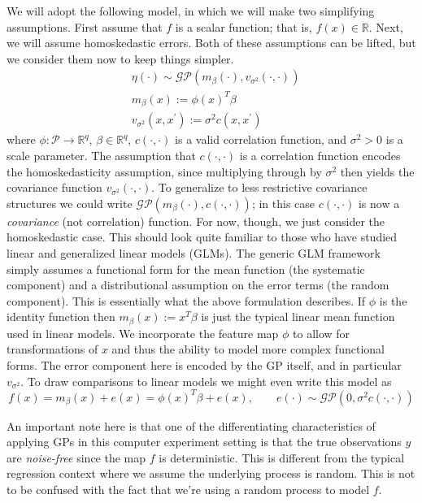 \documentclass[12pt]{article}
\newcommand{\R}{\mathcal{R}}
\def\R{\mathbb{R}}
\begin{document}
We will adopt the following model, in which we will make two simplifying assumptions. First assume that $f$ is a scalar function; that is, $f(x) \in \R$. Next, we will assume homoskedastic 
errors. Both of these assumptions can be lifted, but we consider them now to keep things simpler.
\begin{align*}
&\eta(\cdot) \sim \mathcal{GP}(m_\beta (\cdot), v_{\sigma^2}(\cdot, \cdot)) \\
&m_\beta (x) := \phi(x)^T \beta \\
&v_{\sigma^2}(x, x^\prime) := \sigma^2 c(x, x^\prime)
\end{align*}
where $\phi: \mathcal{P} \to \R^q$, $\beta \in \R^q$, $c(\cdot, \cdot)$ is a valid correlation function, and $\sigma^2 > 0$ is a scale parameter. The assumption that $c(\cdot, \cdot)$ is a correlation function
encodes the homoskedasticity assumption, since multiplying through by $\sigma^2$ then yields the covariance function $v_{\sigma^2}(\cdot, \cdot)$. To generalize to less restrictive covariance structures 
we could write $\mathcal{GP}(m_\beta(\cdot), c(\cdot, \cdot))$; in this case $c(\cdot, \cdot)$ is now a \textit{covariance} (not correlation) function. For now, though, we just consider the homoskedastic case. 
This should look quite familiar to those who have studied linear and generalized linear models (GLMs). The generic GLM framework simply assumes a functional form for the mean function
(the systematic component) and a distributional assumption on the error terms (the random component). This is essentially what the above formulation describes. If $\phi$ is the identity function
then $m_\beta (x) := x^T \beta$ is just the typical linear mean function used in linear models. We incorporate the feature map $\phi$ to allow for transformations of $x$ and thus the ability to 
model more complex functional forms. The error component here is encoded by the GP itself, and in particular $v_{\sigma^2}$. To draw comparisons to linear models we might even write this model as
\[f(x) = m_\beta(x) + e(x) = \phi(x)^T \beta + e(x), \qquad e(\cdot) \sim \mathcal{GP}(0, \sigma^2 c(\cdot, \cdot))\]

An important note here is that one of the 
differentiating characteristics of applying GPs in this computer experiment setting is that the true observations $y$ are \textit{noise-free} since the map $f$ is deterministic. This is different from the 
typical regression context where we assume the underlying process is random. This is not to be confused with the fact that we're using a random process to model $f$. 
\end{document}
